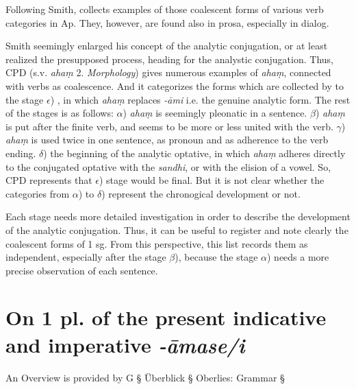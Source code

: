 \documentclass[11pt]{article}
\newcommand*\ṛ{r\symbol{"325}}
\newcommand*\Ṛ{R\symbol{"325}}
\newcommand*\ṝ{r\symbol{"304}\symbol{"325}}
\newcommand*\Ṝ{R\symbol{"304}\symbol{"325}}
\newcommand*\ḷ{l\symbol{"325}}
\newcommand*\ḹ{l\symbol{"304}\symbol{"325}}
\newcommand*\Ḷ{L\symbol{"325}}
\newcommand*\Ḹ{L\symbol{"304}\symbol{"325}}
\begin{document}
%

Following Smith, \citet[312-313]{Bechert:1953} collects examples of those coalescent forms of various verb categories in Ap.
They, however, are found also in prosa, especially in dialog.

Smith seemingly enlarged his concept of the analytic conjugation, or at least realized the presupposed process, heading for the analystic conjugation.
Thus, CPD (s.v. \textit{ahaṃ} 2. \textit{Morphology}) gives numerous examples of \textit{ahaṃ}, connected with verbs as coalescence.
And it categorizes the forms which are collected by \citet{Smith:1932} to the stage
$\epsilon$) , in which \textit{ahaṃ} replaces \textit{-āmi} i.e. the genuine analytic form.
The rest of the stages is as follows:
$\alpha$) \textit{ahaṃ} is seemingly pleonatic in a sentence.
$\beta$) \textit{ahaṃ} is put after the finite verb, and seems to be more or less united with the verb.
$\gamma$) \textit{ahaṃ} is used twice in one sentence, as pronoun and as adherence to the verb ending.
$\delta$) the beginning of the analytic optative, in which \textit{ahaṃ} adheres directly to the conjugated optative with the \textit{sandhi}, or with the elision of a vowel.
So, CPD represents that $\epsilon$) stage would be final.
But it is not clear whether the categories from $\alpha$) to $\delta$) represent the chronogical development or not.

Each stage needs more detailed investigation in order to describe the development of the analytic conjugation.
Thus, it can be useful to register and note clearly the coalescent forms of 1 sg.
From this perspective, this list records them as independent, especially after the stage $\beta$),
because the stage $\alpha$) needs a more precise observation of each sentence.


\section{On 1 pl. of the present indicative and imperative \textit{-āmase/i}}
An Overview is provided by G § Überblick § Oberlies: Grammar §
\end{document}
